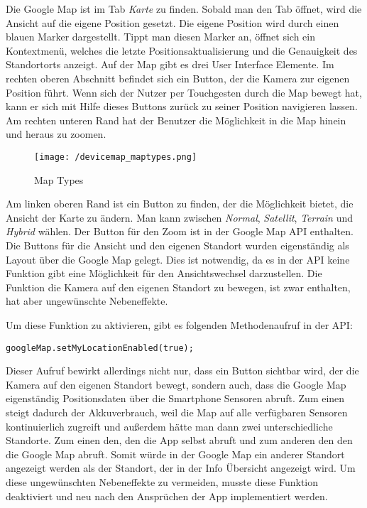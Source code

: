 Die Google Map ist im Tab \textit{Karte} zu finden. Sobald man den Tab öffnet, wird die Ansicht auf die eigene Position gesetzt. Die eigene Position wird durch einen blauen Marker dargestellt. Tippt man diesen Marker an, öffnet sich ein Kontextmenü, welches die letzte Positionsaktualisierung und die Genauigkeit des Standortorts anzeigt.
Auf der Map gibt es drei User Interface Elemente. Im rechten oberen Abschnitt befindet sich ein Button, der die Kamera zur eigenen Position führt. Wenn sich der Nutzer per Touchgesten durch die Map bewegt hat, kann er sich mit Hilfe dieses Buttons zurück zu seiner Position navigieren lassen. Am rechten unteren Rand hat der Benutzer die Möglichkeit in die Map hinein und heraus zu zoomen. 
\par\bigskip\bigskip
\begin{wrapfigure}{l}{40mm}
\centering
\vspace{-10mm}
   \texttt{[image: /devicemap\_maptypes.png]} 
\vspace{-10mm}
\caption[User Interface: Map Types]{Map Types}
\vspace{-20mm}
\end{wrapfigure}

Am linken oberen Rand ist ein Button zu finden, der die Möglichkeit bietet, die Ansicht der Karte zu ändern. Man kann zwischen \textit{Normal}, \textit{Satellit}, \textit{Terrain} und \textit{Hybrid} wählen. 
Der Button für den Zoom ist in der Google Map API enthalten. Die Buttons für die Ansicht und den eigenen Standort wurden eigenständig als Layout über die Google Map gelegt. Dies ist notwendig, da es in der API keine Funktion gibt eine Möglichkeit für den Ansichtswechsel darzustellen. Die Funktion die Kamera auf den eigenen Standort zu bewegen, ist zwar enthalten, hat aber ungewünschte Nebeneffekte. 
\par\bigskip\bigskip\bigskip\bigskip

Um diese Funktion zu aktivieren, gibt es folgenden Methodenaufruf in der API: 

\begin{lstlisting}[caption={},label=lst:setMyLocationEnabled]
	googleMap.setMyLocationEnabled(true);
\end{lstlisting}

Dieser Aufruf bewirkt allerdings nicht nur, dass ein Button sichtbar wird, der die Kamera auf den eigenen Standort bewegt, sondern auch, dass die Google Map eigenständig Positionsdaten über die Smartphone Sensoren abruft. Zum einen steigt dadurch der Akkuverbrauch, weil die Map auf alle verfügbaren Sensoren kontinuierlich zugreift und außerdem hätte man dann zwei unterschiedliche Standorte. Zum einen den, den die App selbst abruft und zum anderen den den die Google Map abruft. Somit würde in der Google Map ein anderer Standort angezeigt werden als der Standort, der in der Info Übersicht angezeigt wird. Um diese ungewünschten Nebeneffekte zu vermeiden, musste diese Funktion deaktiviert und neu nach den Ansprüchen der App implementiert werden.

